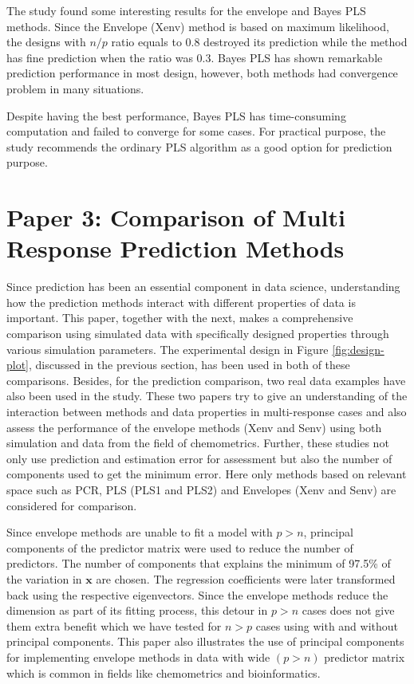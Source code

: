 \documentclass[11pt,twoside,openright,titlepage,
  headinclude,footinclude,BCOR=5mm,
  numbers=noenddot,cleardoublepage=empty,
  tablecaptionabove, dottedtoc,
  bibliography=totoc,paper=a4]{scrreprt}
\begin{document}
The study found some interesting results for the envelope and Bayes PLS methods. Since the Envelope (Xenv) method is based on maximum likelihood, the designs with \(n/p\) ratio equals to 0.8 destroyed its prediction while the method has fine prediction when the ratio was 0.3. Bayes PLS has shown remarkable prediction performance in most design, however, both methods had convergence problem in many situations.

Despite having the best performance, Bayes PLS has time-consuming computation and failed to converge for some cases. For practical purpose, the study recommends the ordinary PLS algorithm as a good option for prediction purpose.

\hypertarget{paper-3-comparison-of-multi-response-prediction-methods}{%
\section{Paper 3: Comparison of Multi Response Prediction Methods}\label{paper-3-comparison-of-multi-response-prediction-methods}}

Since prediction has been an essential component in data science, understanding how the prediction methods interact with different properties of data is important. This paper, together with the next, makes a comprehensive comparison using simulated data with specifically designed properties through various simulation parameters. The experimental design in Figure \ref{fig:design-plot}, discussed in the previous section, has been used in both of these comparisons. Besides, for the prediction comparison, two real data examples have also been used in the study. These two papers try to give an understanding of the interaction between methods and data properties in multi-response cases and also assess the performance of the envelope methods (Xenv and Senv) using both simulation and data from the field of chemometrics. Further, these studies not only use prediction and estimation error for assessment but also the number of components used to get the minimum error. Here only methods based on relevant space such as PCR, PLS (PLS1 and PLS2) and Envelopes (Xenv and Senv) are considered for comparison.

Since envelope methods are unable to fit a model with \(p>n\), principal components of the predictor matrix were used to reduce the number of predictors. The number of components that explains the minimum of 97.5\% of the variation in \(\mathbf{x}\) are chosen. The regression coefficients were later transformed back using the respective eigenvectors. Since the envelope methods reduce the dimension as part of its fitting process, this detour in \(p>n\) cases does not give them extra benefit which we have tested for \(n>p\) cases using with and without principal components. This paper also illustrates the use of principal components for implementing envelope methods in data with wide \((p>n)\) predictor matrix which is common in fields like chemometrics and bioinformatics.
\end{document}
